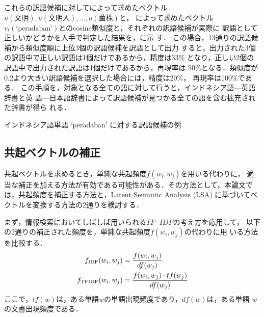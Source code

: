 \documentclass[japanese]{jnlp_1.4}
\newcommand{\tabref}[1]{}
\newcommand{\eqnref}[1]{}
\begin{document}
これらの訳語候補に対して\eqnref{eq:dst_vector}によって求めたベクトル
$u(\mbox{文明}),u(\mbox{文明人}),\ldots,u(\mbox{菌株})$と，
\eqnref{eq:trans_vector}によって求めたベクトル
$v_{t}(\mbox{`peradaban'})$とのcosine類似度と，それぞれの訳語候補が実際に
訳語として正しいかどうかを人手で判定した結果を，\tabref{tbl:example}に示
す．
この場合，13通りの訳語候補から類似度順に上位3個の訳語候補を訳語として出力
すると，出力された3個の訳語中で正しい訳語は1個だけであるから，精度は33\%
となり，正しい2個の訳語中で出力された訳語は1個だけであるから，再現率は
50\%となる．類似度が0.2より大きい訳語候補を選択した場合には，精度は20\%，
再現率は100\%である．
この手順を，対象となる全ての語に対して行うと，インドネシア語—英語辞書と英
語—日本語辞書によって訳語候補が見つかる全ての語を含む拡充された辞書が得ら
れる．

\begin{table}[t]
  \caption{インドネシア語単語 `peradaban' に対する訳語候補の例}
  \label{tbl:example}
  \begin{center}

  \end{center}
\end{table}


\subsection{共起ベクトルの補正}

共起ベクトルを求めるとき，単純な共起頻度$f(w_{i},w_{j})$を用いる代わりに，
適当な補正を加える方法が有効である可能性がある．その方法として，本論文で
は，共起頻度を補正する方法と，Latent Semantic Analysis (LSA) に基づいてベ
クトルを変換する方法の2通りを検討する．

まず，情報検索においてしばしば用いられる$TF\cdot IDF$の考え方を応用して，
以下の2通りの補正された頻度を，単純な共起頻度$f(w_{i},w_{j})$の代わりに用
いる方法を比較する．
\begin{align}
  f_{\rm IDF}(w_{i},w_{j}) &= \frac{f(w_{i},w_{j})}{df(w_{j})} \label{eq:IDF}\\
  f_{\rm TFIDF}(w_{i},w_{j}) &= \frac{f(w_{i},w_{j})\cdot{}tf(w_{j})}{df(w_{j})} \label{eq:TFIDF}
\end{align}
ここで，$tf(w)$は，ある単語$w$の単語出現頻度であり，$df(w)$は，ある単語
$w$の文書出現頻度である．
\end{document}
